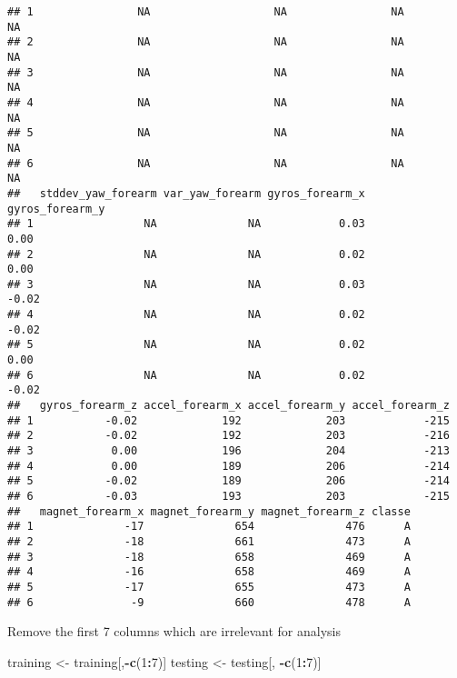 \documentclass[
]{article}
\newenvironment{Shaded}{\begin{snugshade}}{\end{snugshade}}
\newcommand{\DecValTok}[1]{\textcolor[rgb]{0.00,0.00,0.81}{#1}}
\newcommand{\KeywordTok}[1]{\textcolor[rgb]{0.13,0.29,0.53}{\textbf{#1}}}
\newcommand{\NormalTok}[1]{#1}
\newcommand{\OperatorTok}[1]{\textcolor[rgb]{0.81,0.36,0.00}{\textbf{#1}}}
\newcommand{\StringTok}[1]{\textcolor[rgb]{0.31,0.60,0.02}{#1}}
\begin{document}
\begin{verbatim}
## 1                NA                   NA                NA              NA
## 2                NA                   NA                NA              NA
## 3                NA                   NA                NA              NA
## 4                NA                   NA                NA              NA
## 5                NA                   NA                NA              NA
## 6                NA                   NA                NA              NA
##   stddev_yaw_forearm var_yaw_forearm gyros_forearm_x gyros_forearm_y
## 1                 NA              NA            0.03            0.00
## 2                 NA              NA            0.02            0.00
## 3                 NA              NA            0.03           -0.02
## 4                 NA              NA            0.02           -0.02
## 5                 NA              NA            0.02            0.00
## 6                 NA              NA            0.02           -0.02
##   gyros_forearm_z accel_forearm_x accel_forearm_y accel_forearm_z
## 1           -0.02             192             203            -215
## 2           -0.02             192             203            -216
## 3            0.00             196             204            -213
## 4            0.00             189             206            -214
## 5           -0.02             189             206            -214
## 6           -0.03             193             203            -215
##   magnet_forearm_x magnet_forearm_y magnet_forearm_z classe
## 1              -17              654              476      A
## 2              -18              661              473      A
## 3              -18              658              469      A
## 4              -16              658              469      A
## 5              -17              655              473      A
## 6               -9              660              478      A
\end{verbatim}

Remove the first 7 columns which are irrelevant for analysis

\begin{Shaded}
\begin{Highlighting}[]
\NormalTok{training <-}\StringTok{ }\NormalTok{training[,}\OperatorTok{-}\KeywordTok{c}\NormalTok{(}\DecValTok{1}\OperatorTok{:}\DecValTok{7}\NormalTok{)]}
\NormalTok{testing <-}\StringTok{ }\NormalTok{testing[, }\OperatorTok{-}\KeywordTok{c}\NormalTok{(}\DecValTok{1}\OperatorTok{:}\DecValTok{7}\NormalTok{)]}
\end{Highlighting}
\end{Shaded}
\end{document}
